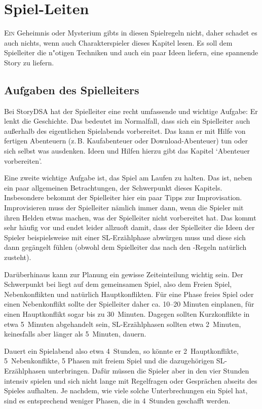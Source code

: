 \chapter{Spiel-Leiten}\label{Ch:SpielLeiten}
\lettrine{E}{in} Geheimnis oder Mysterium gibts in diesen Spielregeln nicht, daher schadet es auch nichts, wenn auch Charakterspieler dieses Kapitel lesen. Es soll dem Spielleiter die n"otigen Techniken und auch ein paar Ideen liefern, eine spannende Story zu liefern.

\section{Aufgaben des Spielleiters}
Bei StoryDSA hat der Spielleiter eine recht umfassende und wichtige Aufgabe: Er lenkt die Geschichte. Das bedeutet im Normalfall, dass sich ein Spielleiter auch außerhalb des eigentlichen Spielabends vorbereitet. Das kann er mit Hilfe von fertigen Abenteuern (z.\,B. Kaufabenteuer oder Download-Abenteuer) tun oder sich selbst was ausdenken. Ideen und Hilfen hierzu gibt das Kapitel `Abenteuer vorbereiten'.

Eine zweite wichtige Aufgabe ist, das Spiel am Laufen zu halten. Das ist, neben ein paar allgemeinen Betrachtungen, der Schwerpunkt dieses Kapitels. Insbesondere bekommt der Spielleiter hier ein paar Tipps zur Improvisation. Improvisieren muss der Spielleiter nämlich immer dann, wenn die Spieler mit ihren Helden etwas machen, was der Spielleiter nicht vorbereitet hat. Das kommt sehr häufig vor und endet leider allzuoft damit, dass der Spielleiter die Ideen der Spieler beispielsweise mit einer SL-Erzählphase abwürgen muss und diese sich dann gegängelt fühlen (obwohl dem Spielleiter das nach den \StoryDSA-Regeln natürlich zusteht).

Darüberhinaus kann zur Planung ein gewisse Zeiteinteilung wichtig sein. Der Schwerpunkt bei \StoryDSA liegt auf dem gemeinsamen Spiel, also dem Freien Spiel, Nebenkonflikten und natürlich Hauptkonflikten. Für eine Phase freies Spiel oder einen Nebenkonflikt sollte der Spielleiter daher ca. 10--20 Minuten einplanen, für einen Hauptkonflikt sogar bis zu 30~Minuten. Dagegen sollten Kurzkonflikte in etwa 5~Minuten abgehandelt sein, SL-Erzählphasen sollten etwa 2~Minuten, keinesfalls aber länger als 5~Minuten, dauern.

Dauert ein Spielabend also etwa 4~Stunden, so könnte er 2~Hauptkonflikte, 5~Nebenkonflikte, 5 Phasen mit freiem Spiel und die dazugehörigen SL-Erzählphasen unterbringen. Dafür müssen die Spieler aber in den vier Stunden intensiv spielen und sich nicht lange mit Regelfragen oder Gesprächen abseits des Spieles aufhalten. Je nachdem, wie viele solche Unterbrechungen ein Spiel hat, sind es entsprechend weniger Phasen, die in 4~Stunden geschafft werden.

